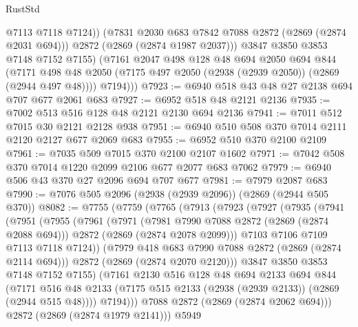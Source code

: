 \begin{lexlean}{RustStd}
\begin{coremodule}
                @7113
                @7118
                @7124))
            (@7831 @2030 @683 @7842 @7088 @2872 (@2869 (@2874 @2031 @694)))
            @2872
            (@2869 (@2874 @1987 @2037)))
          @3847
          @3850
          @3853
          @7148
          @7152
          @7155)
        (@7161
          @2047
          @498
          @128
          @48
          @694
          @2050
          @694
          @844
          (@7171 @498 @48 @2050 (@7175 @497 @2050 (@2938 (@2939 @2050)) (@2869 (@2944 @497 @48))))
          @7194)))
@7923 := @6940 @518 @43 @48 @27 @2138 @694 @707 @677 @2061 @683
@7927 := @6952 @518 @48 @2121 @2136
@7935 := @7002 @513 @516 @128 @48 @2121 @2130 @694 @2136
@7941 := @7011 @512 @7015 @30 @2121 @2128 @938
@7951 := @6940 @510 @508 @370 @7014 @2111 @2120 @2127 @677 @2069 @683
@7955 := @6952 @510 @370 @2100 @2109
@7961 := @7035 @509 @7015 @370 @2100 @2107 @1602
@7971 := @7042 @508 @370 @7014 @1220 @2099 @2106 @677 @2077 @683 @7062
@7979 := @6940 @506 @43 @370 @27 @2096 @694 @707 @677
@7981 := @7979 @2087 @683
@7990 := @7076 @505 @2096 (@2938 (@2939 @2096)) (@2869 (@2944 @505 @370))
@8082 := @7755
    (@7759
      (@7765
        (@7913
          (@7923
            (@7927
              (@7935
                (@7941
                  (@7951
                    (@7955
                      (@7961
                        (@7971
                          (@7981 @7990 @7088 @2872 (@2869 (@2874 @2088 @694)))
                          @2872
                          (@2869 (@2874 @2078 @2099)))
                        @7103
                        @7106
                        @7109
                        @7113
                        @7118
                        @7124))
                    (@7979 @418 @683 @7990 @7088 @2872 (@2869 (@2874 @2114 @694)))
                    @2872
                    (@2869 (@2874 @2070 @2120)))
                  @3847
                  @3850
                  @3853
                  @7148
                  @7152
                  @7155)
                (@7161
                  @2130
                  @516
                  @128
                  @48
                  @694
                  @2133
                  @694
                  @844
                  (@7171
                    @516
                    @48
                    @2133
                    (@7175 @515 @2133 (@2938 (@2939 @2133)) (@2869 (@2944 @515 @48))))
                  @7194)))
            @7088
            @2872
            (@2869 (@2874 @2062 @694)))
          @2872
          (@2869 (@2874 @1979 @2141)))
        @5949

\end{coremodule}
\end{lexlean}
